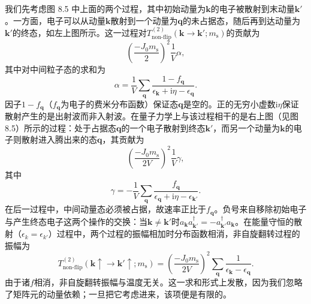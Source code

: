 我们先考虑图 8.5 中上面的两个过程，其中初始动量为$\mathbf{k}$的电子被散射到末动量$\mathbf{k}'$。一方面，电子可以从动量$\mathbf{k}$散射到一个动量为$\mathbf{q}$的未占据态，随后再到达动量为$\mathbf{k}'$的终态，如左上图所示。这一过程对$T_{\mathrm{non\text{-}flip}}^{(2)}(\mathbf{k}\to\mathbf{k}';m_{\mathrm{s}})$的贡献为
\begin{equation*}
\left(\frac{-J_0 m_{\mathrm{s}}}{2}\right)^2\frac{1}{V}\alpha,
\tag{8.26}
\end{equation*}
其中对中间粒子态的求和为
\begin{equation*}
\alpha = \frac{1}{V}\sum_{\mathbf{q}}\frac{1-f_{\mathbf{q}}}{\epsilon_{\mathbf{k}}+\mathrm{i}\eta-\epsilon_{\mathbf{q}}}.
\tag{8.27}
\end{equation*}
因子$1-f_{\mathbf{q}}$（$f_{\mathbf{q}}$为电子的费米分布函数）保证态$\mathbf{q}$是空的。正的无穷小虚数$\mathrm{i}\eta$保证散射产生的是出射波而非入射波。在量子力学上与该过程相干的是右上图（见图 8.5）所示的过程：处于占据态$\mathbf{q}$的一个电子散射到终态$\mathbf{k}'$，而另一个动量为$\mathbf{k}$的电子则散射进入腾出来的态$\mathbf{q}$，其贡献为
\begin{equation*}
\left(\frac{-J_0 m_{\mathrm{s}}}{2V}\right)^2\frac{1}{V}\gamma,
\tag{8.28}
\end{equation*}
其中
\begin{equation*}
\gamma = -\frac{1}{V}\sum_{\mathbf{q}}\frac{f_{\mathbf{q}}}{\epsilon_{\mathbf{q}}+\mathrm{i}\eta-\epsilon_{\mathbf{k}'}}.
\tag{8.29}
\end{equation*}
在后一过程中，中间动量态必须被占据，故速率正比于$f_{\mathbf{q}}$。负号来自移除初始电子与产生终态电子这两个操作的交换：当$\mathbf{k}\neq\mathbf{k}'$时$a_{\mathbf{k}}a_{\mathbf{k}'}^{\dagger}=-a_{\mathbf{k}'}^{\dagger}a_{\mathbf{k}}$。在能量守恒的散射（$\epsilon_k=\epsilon_{k'}$）过程中，两个过程的振幅相加时分布函数相消，非自旋翻转过程的振幅为
\begin{equation*}
T_{\mathrm{non\text{-}flip}}^{(2)}(\mathbf{k}\uparrow\to\mathbf{k}'\uparrow;m_{\mathrm{s}}) = \left(\frac{-J_0 m_{\mathrm{s}}}{2V}\right)^2\sum_{\mathbf{q}}\frac{1}{\epsilon_{\mathbf{k}}-\epsilon_{\mathbf{q}}}.
\tag{8.30}
\end{equation*}
由于诸$f$相消，非自旋翻转振幅与温度无关。这一求和形式上发散，因为我们忽略了矩阵元的动量依赖；一旦把它考虑进来，该项便是有限的。

